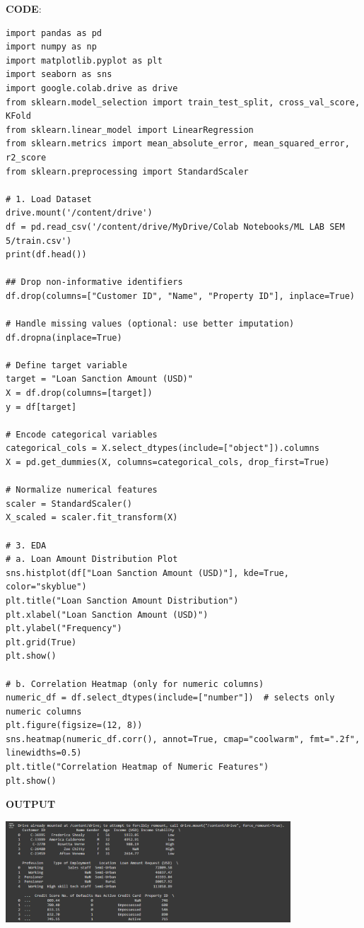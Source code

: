 \documentclass[11pt]{article}
\begin{document}
\vspace{0.5cm}
\noindent
\textbf{\large CODE}:
\begin{verbatim}
import pandas as pd
import numpy as np
import matplotlib.pyplot as plt
import seaborn as sns
import google.colab.drive as drive
from sklearn.model_selection import train_test_split, cross_val_score, KFold
from sklearn.linear_model import LinearRegression
from sklearn.metrics import mean_absolute_error, mean_squared_error, r2_score
from sklearn.preprocessing import StandardScaler

# 1. Load Dataset
drive.mount('/content/drive')
df = pd.read_csv('/content/drive/MyDrive/Colab Notebooks/ML LAB SEM 5/train.csv')
print(df.head())

## Drop non-informative identifiers
df.drop(columns=["Customer ID", "Name", "Property ID"], inplace=True)

# Handle missing values (optional: use better imputation)
df.dropna(inplace=True)

# Define target variable
target = "Loan Sanction Amount (USD)"
X = df.drop(columns=[target])
y = df[target]

# Encode categorical variables
categorical_cols = X.select_dtypes(include=["object"]).columns
X = pd.get_dummies(X, columns=categorical_cols, drop_first=True)

# Normalize numerical features
scaler = StandardScaler()
X_scaled = scaler.fit_transform(X)

# 3. EDA
# a. Loan Amount Distribution Plot
sns.histplot(df["Loan Sanction Amount (USD)"], kde=True, color="skyblue")
plt.title("Loan Sanction Amount Distribution")
plt.xlabel("Loan Sanction Amount (USD)")
plt.ylabel("Frequency")
plt.grid(True)
plt.show()

# b. Correlation Heatmap (only for numeric columns)
numeric_df = df.select_dtypes(include=["number"])  # selects only numeric columns
plt.figure(figsize=(12, 8))
sns.heatmap(numeric_df.corr(), annot=True, cmap="coolwarm", fmt=".2f", linewidths=0.5)
plt.title("Correlation Heatmap of Numeric Features")
plt.show()
\end{verbatim}
\textbf{OUTPUT}
\begin{center}
  \includegraphics[width=0.8\textwidth]{sc1.png}
\end{center}
\end{document}
